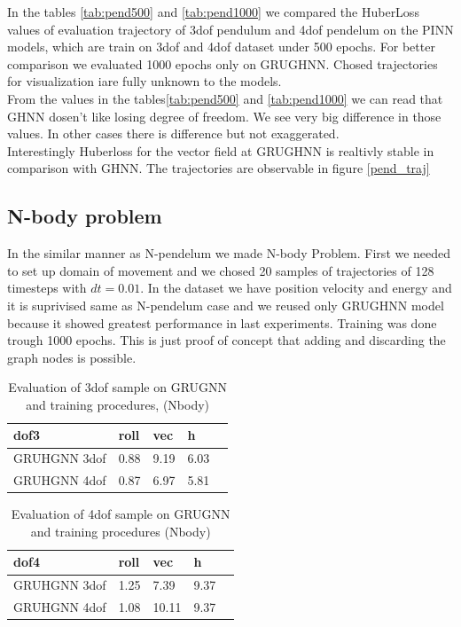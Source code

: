 In the tables \ref{tab:pend500} and  \ref{tab:pend1000} we compared the HuberLoss values of evaluation trajectory of 3dof pendulum and 4dof pendelum on the PINN models, which are train on 3dof and 4dof dataset under 500 epochs. For better comparison we evaluated  1000 epochs only on GRUGHNN. Chosed trajectories for visualization iare fully unknown to the models.\\ 
From the values in the tables\ref{tab:pend500} and \ref{tab:pend1000} we can read that GHNN dosen't like losing degree of freedom. We see very big difference in those values. In other cases there is difference but not exaggerated.\\
Interestingly Huberloss for the vector field at GRUGHNN is realtivly stable in comparison with GHNN.  
The trajectories are observable in figure \ref{pend_traj}

\subsection{N-body problem}
In the similar manner as N-pendelum we made N-body Problem.
First we needed to set up domain of movement and we chosed 20 samples of trajectories of 128 timesteps with $dt =0.01$. In the dataset we have position velocity and energy and it is suprivised same as N-pendelum case and we reused only GRUGHNN model because it showed greatest performance in last experiments. Training was done trough 1000 epochs. This is just proof of concept that adding and discarding the graph nodes is possible.
\begin{table}[h!]
	\centering
	\caption{Evaluation of 3dof sample on GRUGNN and training procedures, (Nbody)} %
	\label{nbody_9dof}  
\begin{tabular}{|l|l|l|l|l|}
	\hline
	dof3 & roll & vec & h\\  
	\hline
	GRUHGNN 3dof & 0.88 & 9.19 & 6.03 \\  
	\hline
	GRUHGNN 4dof & 0.87 & 6.97 & 5.81 \\  
	\hline
\end{tabular}
\end{table}

\begin{table}[h!]
	\centering
	\caption{Evaluation of 4dof sample on GRUGNN and training procedures (Nbody)} %
	\label{nbody_10dof}  
\begin{tabular}{|l|l|l|l|l|}
	\hline
	dof4 & roll & vec & h\\  
	\hline
	GRUHGNN 3dof & 1.25 & 7.39 & 9.37 \\  
	\hline
	GRUHGNN 4dof & 1.08 & 10.11 & 9.37 \\  
	\hline
\end{tabular}
\end{table}



